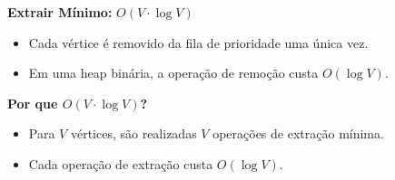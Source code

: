 \documentclass[preview]{standalone}
\begin{document}
\begin{center}
\textbf{Extrair Mínimo:} $O(V \cdot \log V)$
            \begin{itemize}
                \item Cada vértice é removido da fila de prioridade uma única vez.
                \item Em uma heap binária, a operação de remoção custa $O(\log V)$.
            \end{itemize}
            
            \textbf{Por que $O(V \cdot \log V)$?}
            \begin{itemize}
                \item Para $V$ vértices, são realizadas $V$ operações de extração mínima.
                \item Cada operação de extração custa $O(\log V)$.
            \end{itemize}
\end{center}
\end{document}
